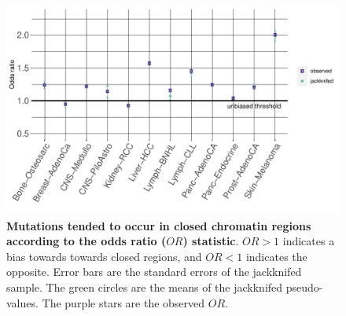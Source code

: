 \begin{figure}[h!]
    \centering
    \includegraphics[scale=0.8]{graphics/jackknife_OR.pdf}
    \caption{\textbf{Mutations tended to occur in closed chromatin regions according to the odds ratio ($OR$) statistic}. $OR>1$ indicates a bias towards towards closed regions, and $OR<1$ indicates the opposite. Error bars are the standard errors of the jackknifed sample. The green circles are the means of the jackknifed pseudo-values. The purple stars are the observed $OR$.}
    \label{fig:or_jackknifed}
\end{figure}

